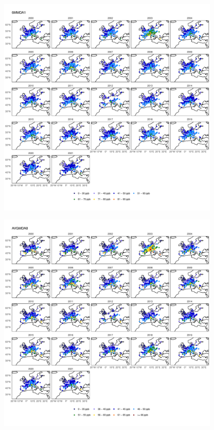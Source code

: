 \documentclass{article}
\begin{document}
\begin{figure}
\centering
\includegraphics[height=0.9\textheight]{figures/si_figures/fS14_metric_map_Europe_6MMDA1.pdf}
\caption{}
\label{si_fig:metric_map_eu_6MMDA1}
\end{figure}
\clearpage

\begin{figure}
\centering
\includegraphics[height=0.9\textheight]{figures/si_figures/fS15_metric_map_Europe_AVGMDA8.pdf}
\caption{}
\label{si_fig:metric_map_eu_AVGMDA8}
\end{figure}
\clearpage
\end{document}
